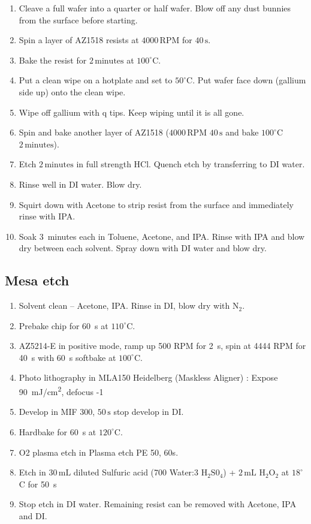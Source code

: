 \begin{enumerate}
\item Cleave a full wafer into a quarter or half wafer. Blow off any dust bunnies from the surface before starting.
\item Spin a layer of AZ1518 resists at $4000 \,\mathrm{RPM}$ for $40\,\mathrm{s}$.
\item Bake the resist for $2\,\mathrm{minutes}$ at $100^\circ$C.
\item Put a clean wipe on a hotplate and set to $50^\circ$C. Put wafer face down (gallium side up) onto the clean wipe.
\item Wipe off gallium with q tips. Keep wiping until it is all gone.
\item Spin and bake another layer of AZ1518 ($4000 \,\mathrm{RPM}$ $40\,\mathrm{s}$ and bake $100^\circ$C $2\,\mathrm{minutes}$).
\item Etch $2 \,\mathrm{minutes}$ in full strength HCl. Quench etch by transferring to DI water.
\item Rinse well in DI water. Blow dry.
\item Squirt down with Acetone to strip resist from the surface and immediately rinse with IPA.
\item Soak 3~minutes each in Toluene, Acetone, and IPA. Rinse with IPA and blow dry between each solvent. Spray down with DI water and blow dry.
\end{enumerate}

\subsection{Mesa etch}
\begin{enumerate}
\item Solvent clean – Acetone, IPA. Rinse in DI, blow dry with $\mathrm{N_2}$.
\item Prebake chip for \qty{60}{s} at $110^\circ$C.
\item AZ5214-E  in positive mode, ramp up 500 RPM  for \qty{2}{s}, spin at 4444 RPM for \qty{40}{s} with \qty{60}{s} softbake at $100^\circ$C.
\item Photo lithography in MLA150 Heidelberg (Maskless Aligner) : Expose \qty{90}{mJ/cm^2}, defocus -1 
\item Develop in MIF 300, $50\,\mathrm{s}$ stop develop in DI.
\item Hardbake for \qty{60}{s} at $120^\circ$C.
\item O2 plasma etch in Plasma etch PE 50, 60s.
\item Etch in $30\,\mathrm{mL}$ diluted Sulfuric acid (700 Water:3 $\mathrm{H_2S0_4}$) + $2 \,\mathrm{mL}$ $\mathrm{H_2O_2}$ at $18^\circ$C for \qty{50}{s}
\item Stop etch in DI water. Remaining resist can be removed with Acetone, IPA and DI.
\end{enumerate}




